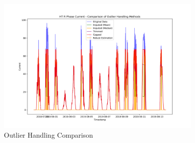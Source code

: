 \begin{figure}[H]
	\centering
	\includegraphics[width=0.9\textwidth]{./Images/outlier_handling_comparison.png}
	\caption{Outlier Handling Comparison}
\end{figure}



\clearpage